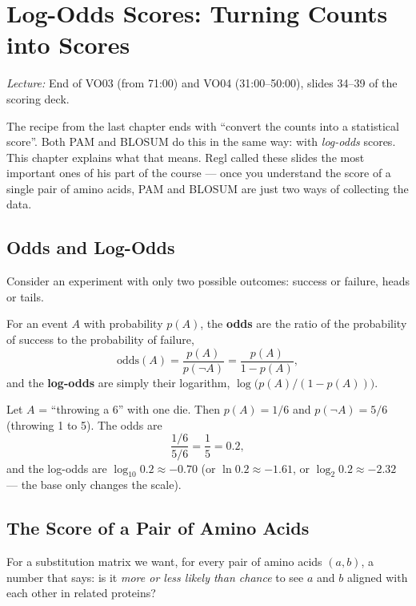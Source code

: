 \documentclass[11pt, oneside]{book}
\newcommand{\lectureref}[1]{%
  \par{\small\color{gray!70!black}\textit{Lecture:} #1}\par}
\let\originalsection\section
\renewcommand{\section}{\Needspace{7\baselineskip}\originalsection}
\begin{document}
\chapter{Log-Odds Scores: Turning Counts into Scores}
\label{ch:logodds}

\lectureref{End of VO03 (from 71:00) and VO04 (31:00--50:00), slides 34--39
of the scoring deck.}

The recipe from the last chapter ends with ``convert the counts into a
statistical score''. Both PAM and BLOSUM do this in the same way: with
\emph{log-odds} scores. This chapter explains what that means. Regl called
these slides the most important ones of his part of the course --- once you
understand the score of a single pair of amino acids, PAM and BLOSUM are just
two ways of collecting the data.

\section{Odds and Log-Odds}

Consider an experiment with only two possible outcomes: success or failure,
heads or tails.

\begin{defbox}[title={Odds and log-odds}]
For an event $A$ with probability $p(A)$, the \textbf{odds} are the ratio of
the probability of success to the probability of failure,
\[
  \text{odds}(A) = \frac{p(A)}{p(\neg A)} = \frac{p(A)}{1 - p(A)},
\]
and the \textbf{log-odds} are simply their logarithm,
$\log\bigl(p(A) / (1 - p(A))\bigr)$.
\end{defbox}

\begin{exbox}[title={Throwing a six}]
Let $A$ = ``throwing a 6'' with one die. Then $p(A) = 1/6$ and
$p(\neg A) = 5/6$ (throwing 1 to 5). The odds are
\[
  \frac{1/6}{5/6} = \frac{1}{5} = 0.2,
\]
and the log-odds are $\log_{10} 0.2 \approx -0.70$ (or $\ln 0.2 \approx -1.61$,
or $\log_2 0.2 \approx -2.32$ --- the base only changes the scale).
\end{exbox}

\section{The Score of a Pair of Amino Acids}

For a substitution matrix we want, for every pair of amino acids $(a,b)$, a
number that says: is it \emph{more or less likely than chance} to see $a$ and
$b$ aligned with each other in related proteins?
\end{document}

